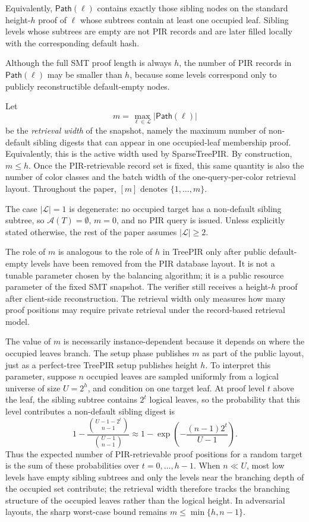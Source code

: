 Equivalently, $\mathsf{Path}(\ell)$ contains exactly those sibling nodes on the standard height-$h$ proof of $\ell$ whose subtrees contain at least one occupied leaf. Sibling levels whose subtrees are empty are not PIR records and are later filled locally with the corresponding default hash.

Although the full SMT proof length is always $h$, the number of PIR records in $\mathsf{Path}(\ell)$ may be smaller than $h$, because some levels correspond only to publicly reconstructible default-empty nodes.

Let
\[
m=\max_{\ell\in\mathcal{L}} |\mathsf{Path}(\ell)|
\]
be the \emph{retrieval width} of the snapshot, namely the maximum number of non-default sibling digests that can appear in one occupied-leaf membership proof. Equivalently, this is the active width used by SparseTreePIR. By construction, $m\le h$. Once the PIR-retrievable record set is fixed, this same quantity is also the number of color classes and the batch width of the one-query-per-color retrieval layout. Throughout the paper, $[m]$ denotes $\{1,\ldots,m\}$.

The case $|\mathcal{L}|=1$ is degenerate: no occupied target has a non-default sibling subtree, so $\mathcal{A}(T)=\emptyset$, $m=0$, and no PIR query is issued. Unless explicitly stated otherwise, the rest of the paper assumes $|\mathcal{L}|\ge 2$.

The role of $m$ is analogous to the role of $h$ in TreePIR only after public default-empty levels have been removed from the PIR database layout. It is not a tunable parameter chosen by the balancing algorithm; it is a public resource parameter of the fixed SMT snapshot. The verifier still receives a height-$h$ proof after client-side reconstruction. The retrieval width only measures how many proof positions may require private retrieval under the record-based retrieval model.

\begin{remark}
The value of $m$ is necessarily instance-dependent because it depends on where the occupied leaves branch. The setup phase publishes $m$ as part of the public layout, just as a perfect-tree TreePIR setup publishes height $h$. To interpret this parameter, suppose $n$ occupied leaves are sampled uniformly from a logical universe of size $U=2^h$, and condition on one target leaf. At proof level $t$ above the leaf, the sibling subtree contains $2^t$ logical leaves, so the probability that this level contributes a non-default sibling digest is
\[
1-\frac{\binom{U-1-2^t}{n-1}}{\binom{U-1}{n-1}}
\approx 1-\exp\!\left(-\frac{(n-1)2^t}{U-1}\right).
\]
Thus the expected number of PIR-retrievable proof positions for a random target is the sum of these probabilities over $t=0,\ldots,h-1$. When $n\ll U$, most low levels have empty sibling subtrees and only the levels near the branching depth of the occupied set contribute; the retrieval width therefore tracks the branching structure of the occupied leaves rather than the logical height. In adversarial layouts, the sharp worst-case bound remains $m\le\min\{h,n-1\}$.
\end{remark}

